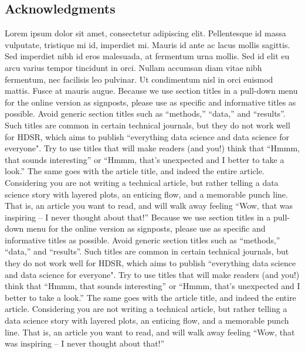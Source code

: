 \documentclass[]{hdsr}
\begin{document}
\subsection*{Acknowledgments}
Lorem ipsum dolor sit amet, consectetur adipiscing elit. Pellentesque id massa vulputate, tristique mi id, imperdiet mi. Mauris id ante ac lacus mollis sagittis. Sed imperdiet nibh id eros malesuada, at fermentum urna mollis. Sed id elit eu arcu varius tempor tincidunt in orci. Nullam accumsan diam vitae nibh fermentum, nec facilisis leo pulvinar. Ut condimentum nisl in orci euismod mattis. Fusce at mauris augue. Because we use section titles in a pull-down menu for the online version as signposts, please use as specific and informative titles as possible. Avoid generic section titles such as ``methods,'' ``data,'' and ``results''. Such titles are common in certain technical journals, but they do not work well for HDSR, which aims to publish ``everything data science and data science for everyone". Try to use titles that will make readers (and you!) think that ``Hmmm, that sounds interesting'' or ``Hmmm, that's unexpected and I better to take a look.''   The same goes with the article title, and indeed the entire article.  Considering you are not writing a technical article, but rather telling a data science story with layered plots, an enticing flow, and a memorable punch line. That is, an article you want to read, and will walk away feeling ``Wow, that was inspiring -- I never thought about that!'' Because we use section titles in a pull-down menu for the online version as signposts, please use as specific and informative titles as possible. Avoid generic section titles such as ``methods,'' ``data,'' and ``results''. Such titles are common in certain technical journals, but they do not work well for HDSR, which aims to publish ``everything data science and data science for everyone". Try to use titles that will make readers (and you!) think that ``Hmmm, that sounds interesting'' or ``Hmmm, that's unexpected and I better to take a look.''   The same goes with the article title, and indeed the entire article.  Considering you are not writing a technical article, but rather telling a data science story with layered plots, an enticing flow, and a memorable punch line. That is, an article you want to read, and will walk away feeling ``Wow, that was inspiring -- I never thought about that!'' 
 
\end{document}
